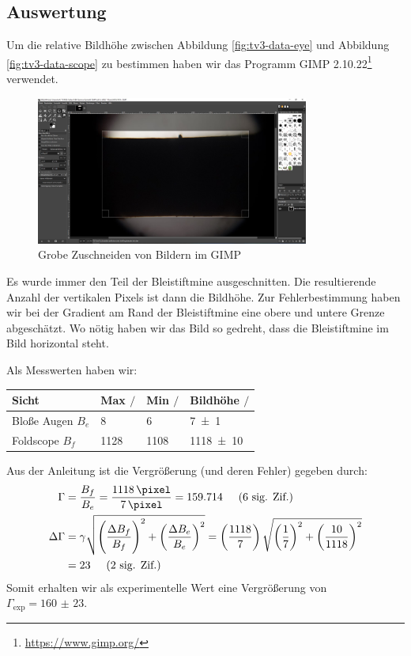 	\subsection{Auswertung}
		Um die relative Bildhöhe zwischen Abbildung \ref{fig:tv3-data-eye} und Abbildung \ref{fig:tv3-data-scope} zu bestimmen haben wir das Programm GIMP 2.10.22\footnote{\url{https://www.gimp.org/}} verwendet. 
		\begin{figure}[H]
			\centering
			\includegraphics[width=0.8\textwidth]{images/tv3/cropping.jpg}
			\caption{Grobe Zuschneiden von Bildern im GIMP}
			\vspace{-10pt}
		\end{figure}
		Es wurde immer den Teil der Bleistiftmine ausgeschnitten. Die resultierende Anzahl der vertikalen Pixels ist dann die Bildhöhe. Zur Fehlerbestimmung haben wir bei der Gradient am Rand der Bleistiftmine eine obere und untere Grenze abgeschätzt. Wo nötig haben wir das Bild so gedreht, dass die Bleistiftmine im Bild horizontal steht.

		Als Messwerten haben wir:
		\begin{center}
			\vspace{\baselineskip}
			\begin{tabular}{llll}
				\toprule
				Sicht & Max $/$ \si{\pixel} & Min $/$ \si{\pixel} & Bildhöhe $/$ \si{\pixel}  \\
				\midrule
				Bloße Augen $B_e$ & \num{8} & \num{6} & \num{7(1)} \\
				Foldscope  $B_f$ & \num{1128} & \num{1108} & \num{1118(10)} \\
				\bottomrule
			\end{tabular}
			\vspace{\baselineskip}
		\end{center}
		Aus der Anleitung ist die Vergrößerung (und deren Fehler) gegeben durch:
		\begin{align}
			\Gamma &= \frac{B_f}{B_e} = \frac{\SI{1118}{\pixel}}{\SI{7}{\pixel}} = \num{159.714} \sigfig{6} \\
			\Delta\Gamma &= \gamma\relquad{B_f,B_e} = \left(\frac{1118}{7}\right)\sqrt{
				\left(\frac{1}{7}\right)^2 +
				\left(\frac{10}{1118}\right)^2
				} \notag \\
				&= \num{23} \sigfig{2}
		\end{align}
		Somit erhalten wir als experimentelle Wert eine Vergrößerung von $\Gamma_\text{exp} = \num{160(23)}$.

